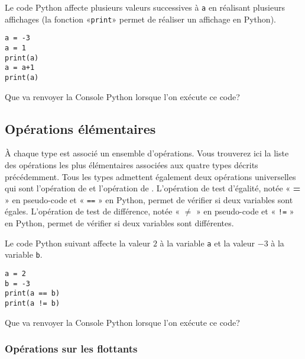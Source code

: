 \begin{exercise}
	Le code Python affecte plusieurs valeurs successives à \texttt{a} en réalisant plusieurs affichages (la fonction «\texttt{print}» permet de réaliser un affichage en Python).
	\begin{center}
		\begin{varwidth}[t]{.5\textwidth}
			\begin{lstlisting}[language=iPython,linewidth = 4cm]	
a = -3
a = 1
print(a)
a = a+1
print(a)\end{lstlisting}\end{varwidth}\end{center}
	Que va renvoyer la Console Python lorsque l'on exécute ce code?
\end{exercise}

\subsection{Opérations élémentaires}

À chaque type est associé un ensemble d'opérations. Vous trouverez ici la liste des opérations les plus élémentaires associées aux quatre types décrits précédemment. Tous les types admettent également deux opérations universelles qui sont l'opération de  et l'opération de . L'opération de test d'égalité, notée « {\ttfamily\bf=} » en pseudo-code et « \texttt{==} » en Python, permet de vérifier si deux variables sont égales. L'opération de test de différence, notée « {\ttfamily\bf$\neq$} » en pseudo-code et « \texttt{!=} » en Python, permet de vérifier si deux variables sont différentes.

\begin{exercise}
	Le code Python suivant affecte la valeur $2$ à la variable \texttt{a} et la valeur $-3$ à la variable \texttt{b}.
	\begin{center}
		\begin{varwidth}[t]{.5\textwidth}
			\begin{lstlisting}[language=iPython,linewidth = 4cm]
a = 2
b = -3
print(a == b)
print(a != b)\end{lstlisting}\end{varwidth}\end{center}
Que va renvoyer la Console Python lorsque l'on exécute ce code?
\end{exercise}

\subsubsection{Opérations sur les flottants}

